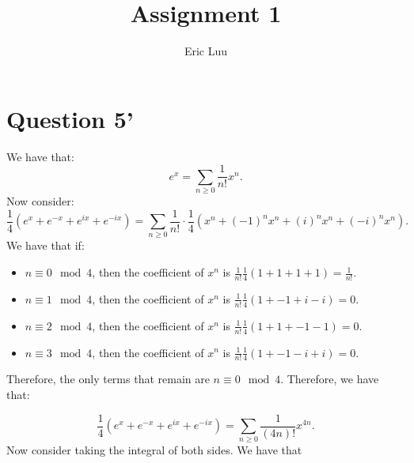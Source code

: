 \documentclass[]{article}
\title{Assignment 1}
\author{Eric Luu}
\begin{document}
\maketitle
\section{Question 5'}
We have that:
\begin{equation}
	e^x = \sum_{n \geq 0} \frac{1}{n!}x^n.
\end{equation}
Now consider:
\begin{equation}
	\frac{1}{4} \left(e^x + e^{-x} + e^{ix} + e^{-ix} \right) = \sum_{n \geq 0} \frac{1}{n!} \cdot \frac{1}{4} \left(x^n + (-1)^n x^n + (i)^n x^n + (-i)^n x^n\right).
\end{equation}
We have that if: 
\begin{itemize}
	\item $n \equiv 0 \mod 4$, then the coefficient of $x^n$ is $\frac{1}{n!}\frac{1}{4} \left(1 + 1 + 1 + 1\right) = \frac{1}{n!}$. 
	\item $n \equiv 1 \mod 4$, then the coefficient of $x^n$ is $\frac{1}{n!}\frac{1}{4} \left(1 + -1 + i -i \right) = 0$. 
	\item $n \equiv 2 \mod 4$, then the coefficient of $x^n$ is $\frac{1}{n!}\frac{1}{4} \left(1 + 1 + -1 -1 \right) = 0$. 
	\item $n \equiv 3 \mod 4$, then the coefficient of $x^n$ is $\frac{1}{n!}\frac{1}{4} \left(1 + -1 -i + i \right) = 0$. 
\end{itemize}
Therefore, the only terms that remain are $n \equiv 0 \mod 4$. Therefore, we have that:

\begin{equation}
	\frac{1}{4} \left(e^x + e^{-x} + e^{ix} + e^{-ix} \right) = \sum_{n \geq 0} \frac{1}{(4n)!} x^{4n}.
\end{equation}
Now consider taking the integral of both sides. We have that
\end{document}
